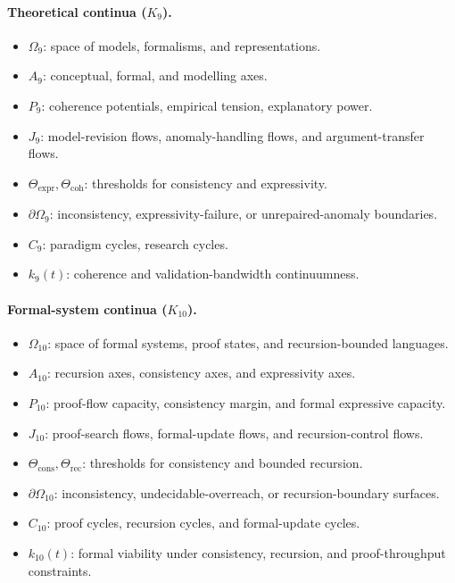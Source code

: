 \paragraph{Theoretical continua (\texorpdfstring{\(K_9\)}{K9}).}
\begin{itemize}
  \item \(\Omega_9\): space of models, formalisms, and representations.
  \item \(A_9\): conceptual, formal, and modelling axes.
  \item \(P_9\): coherence potentials, empirical tension, explanatory power.
  \item \(J_9\): model-revision flows, anomaly-handling flows, and
        argument-transfer flows.
  \item \(\Theta_{\mathrm{expr}}, \Theta_{\mathrm{coh}}\): thresholds for
        consistency and expressivity.
  \item \(\partial\Omega_9\): inconsistency, expressivity-failure, or
        unrepaired-anomaly boundaries.
  \item \(C_9\): paradigm cycles, research cycles.
  \item \(k_9(t)\): coherence and validation-bandwidth continuumness.
\end{itemize}

\paragraph{Formal-system continua (\texorpdfstring{\(K_{10}\)}{K10}).}
\begin{itemize}
  \item \(\Omega_{10}\): space of formal systems, proof states, and
        recursion-bounded languages.
  \item \(A_{10}\): recursion axes, consistency axes, and expressivity axes.
  \item \(P_{10}\): proof-flow capacity, consistency margin, and formal
        expressive capacity.
  \item \(J_{10}\): proof-search flows, formal-update flows, and
        recursion-control flows.
  \item \(\Theta_{\mathrm{cons}}, \Theta_{\mathrm{rec}}\): thresholds for
        consistency and bounded recursion.
  \item \(\partial\Omega_{10}\): inconsistency, undecidable-overreach, or
        recursion-boundary surfaces.
  \item \(C_{10}\): proof cycles, recursion cycles, and formal-update cycles.
  \item \(k_{10}(t)\): formal viability under consistency, recursion, and
        proof-throughput constraints.
\end{itemize}

